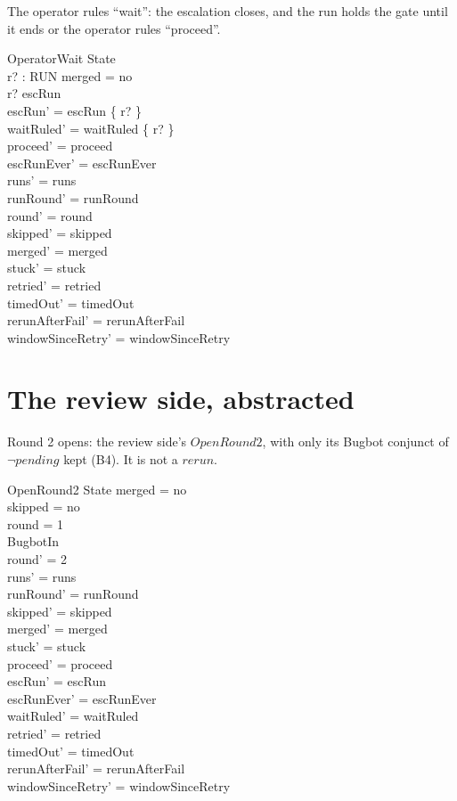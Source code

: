 \documentclass{article}
\begin{document}
The operator rules ``wait'': the escalation closes, and the run holds the gate
until it ends or the operator rules ``proceed''.

\begin{schema}{OperatorWait}
  \Delta State \\
  r? : RUN
\where
  merged = no \\
  r? \in escRun \\
  escRun' = escRun \setminus \{ r? \} \\
  waitRuled' = waitRuled \cup \{ r? \} \\
  proceed' = proceed \\
  escRunEver' = escRunEver \\
  runs' = runs \\
  runRound' = runRound \\
  round' = round \\
  skipped' = skipped \\
  merged' = merged \\
  stuck' = stuck \\
  retried' = retried \\
  timedOut' = timedOut \\
  rerunAfterFail' = rerunAfterFail \\
  windowSinceRetry' = windowSinceRetry
\end{schema}

\section{The review side, abstracted}

Round 2 opens: the review side's $OpenRound2$, with only its Bugbot conjunct
of $\lnot pending$ kept (B4). It is not a $rerun$.

\begin{schema}{OpenRound2}
  \Delta State
\where
  merged = no \\
  skipped = no \\
  round = 1 \\
  BugbotIn \\
  round' = 2 \\
  runs' = runs \\
  runRound' = runRound \\
  skipped' = skipped \\
  merged' = merged \\
  stuck' = stuck \\
  proceed' = proceed \\
  escRun' = escRun \\
  escRunEver' = escRunEver \\
  waitRuled' = waitRuled \\
  retried' = retried \\
  timedOut' = timedOut \\
  rerunAfterFail' = rerunAfterFail \\
  windowSinceRetry' = windowSinceRetry
\end{schema}
\end{document}
